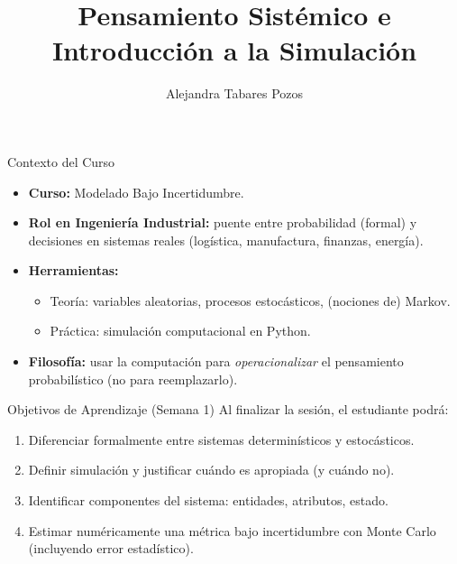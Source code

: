 \documentclass[aspectratio=1610, 9pt]{beamer}
\title[Pensamiento Sistémico e Introducció…]{Pensamiento Sistémico e Introducción a la Simulación}
\subtitle{}
\author{Alejandra Tabares Pozos}
\institute{Universidad de los Andes \\
 Departamento de Ingeniería Industrial}
\date{}
\begin{document}
\begin{frame}
  \titlepage
\end{frame}

\begin{frame}{Contexto del Curso}
\begin{itemize}
  \item \textbf{Curso:} Modelado Bajo Incertidumbre.
  \item \textbf{Rol en Ingeniería Industrial:} puente entre probabilidad (formal) y decisiones en sistemas reales (logística, manufactura, finanzas, energía).
  \item \textbf{Herramientas:}
    \begin{itemize}
      \item Teoría: variables aleatorias, procesos estocásticos, (nociones de) Markov.
      \item Práctica: simulación computacional en Python.
    \end{itemize}
  \item \textbf{Filosofía:} usar la computación para \emph{operacionalizar} el pensamiento probabilístico (no para reemplazarlo).
\end{itemize}
\end{frame}

\begin{frame}{Objetivos de Aprendizaje (Semana 1)}
Al finalizar la sesión, el estudiante podrá:
\begin{enumerate}
  \item Diferenciar formalmente entre sistemas determinísticos y estocásticos.
  \item Definir simulación y justificar cuándo es apropiada (y cuándo no).
  \item Identificar componentes del sistema: entidades, atributos, estado.
  \item Estimar numéricamente una métrica bajo incertidumbre con Monte Carlo (incluyendo error estadístico).
\end{enumerate}
\end{frame}
\end{document}
